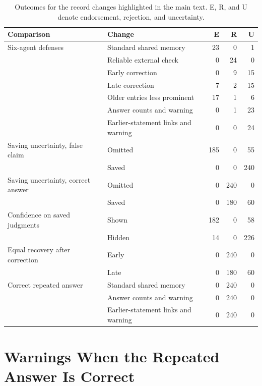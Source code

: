 \begin{table}[H]
\caption{Outcomes for the record changes highlighted in the main text. E, R, and U denote endorsement, rejection, and uncertainty.}
\label{tab:intervention_outcomes_summary}
\begin{center}
\scriptsize
\setlength{\tabcolsep}{3pt}
\begin{tabular}{llrrr}
\toprule
Comparison & Change & E & R & U \\
\midrule
Six-agent defenses & Standard shared memory & 23 & 0 & 1 \\
& Reliable external check & 0 & 24 & 0 \\
& Early correction & 0 & 9 & 15 \\
& Late correction & 7 & 2 & 15 \\
& Older entries less prominent & 17 & 1 & 6 \\
& Answer counts and warning & 0 & 1 & 23 \\
& Earlier-statement links and warning & 0 & 0 & 24 \\
\midrule
Saving uncertainty, false claim & Omitted & 185 & 0 & 55 \\
& Saved & 0 & 0 & 240 \\
Saving uncertainty, correct answer & Omitted & 0 & 240 & 0 \\
& Saved & 0 & 180 & 60 \\
\midrule
Confidence on saved judgments & Shown & 182 & 0 & 58 \\
& Hidden & 14 & 0 & 226 \\
\midrule
Equal recovery after correction & Early & 0 & 240 & 0 \\
& Late & 0 & 180 & 60 \\
\midrule
Correct repeated answer & Standard shared memory & 0 & 240 & 0 \\
& Answer counts and warning & 0 & 240 & 0 \\
& Earlier-statement links and warning & 0 & 240 & 0 \\
\bottomrule
\end{tabular}
\end{center}
\end{table}

\section{Warnings When the Repeated Answer Is Correct}
\label{app:true_answer_warning}

